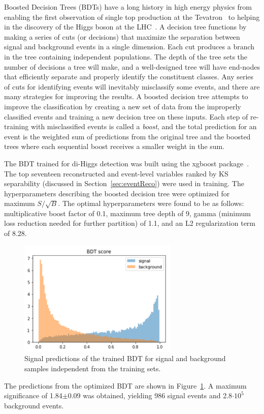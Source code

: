 \label{sec:BDT}
Boosted Decision Trees (BDTs) have a long history in high energy physics from enabling the first observation of single top production at the Tevatron~\cite{Abazov:2006gd, Aaltonen:2008sy} to helping in the discovery of the Higgs boson at the LHC~\cite{Aad_2012, Chatrchyan_2012}. A decision tree functions by making a series of cuts (or decisions) that maximize the separation between signal and background events in a single dimension. Each cut produces a branch in the tree containing independent populations. The depth of the tree sets the number of decisions a tree will make, and a well-designed tree will have end-nodes that efficiently separate and properly identify the constituent classes. Any series of cuts for identifying events will inevitably misclassify some events, and there are many strategies for improving the results. A boosted decision tree attempts to improve the classification by creating a new set of data from the improperly classified events and training a new decision tree on these inputs. Each step of re-training with misclassified events is called a \textit{boost}, and the total prediction for an event is the weighted sum of predictions from the original tree and the boosted trees where each sequential boost receives a smaller weight in the sum.

The BDT trained for di-Higgs detection was built using the xgboost package~\cite{xgboost}. The top seventeen reconstructed and event-level variables ranked by KS separability (discussed in Section~\ref{sec:eventReco}) were used in training. The hyperparameters describing the boosted decision tree were optimized for maximum $S/\sqrt{B}$. The optimal hyperparameters were found to be as follows: multiplicative boost factor of 0.1, maximum tree depth of 9, gamma (minimum loss reduction needed for further partition) of 1.1, and an L2 regularization term of 8.28.

\begin{figure}[!h]
\begin{center}
\includegraphics[width=3in]{BDT/bdt_pred}
\caption{Signal predictions of the trained BDT for signal and background samples independent from the training sets.}
\label{fig:bdt_pred}
\end{center}
\end{figure}

The predictions from the optimized BDT are shown in Figure~\ref{fig:bdt_pred}. A maximum significance of 1.84$\pm$0.09 was obtained, yielding 986 signal events and 2.8$\cdot 10^5$ background events. 
